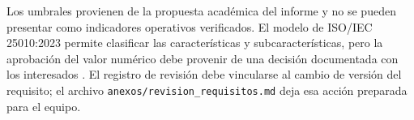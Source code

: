 Los umbrales provienen de la propuesta académica del informe y no se pueden presentar como indicadores operativos verificados. El modelo de ISO/IEC 25010:2023 permite clasificar las características y subcaracterísticas, pero la aprobación del valor numérico debe provenir de una decisión documentada con los interesados \cite{iso25010}. El registro de revisión debe vincularse al cambio de versión del requisito; el archivo \texttt{anexos/revision\_requisitos.md} deja esa acción preparada para el equipo.
